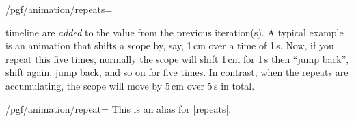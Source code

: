 \begin{key}{/pgf/animation/repeats=}
\begin{itemize}
            timeline are \emph{added} to the value from the previous
            iteration(s). A typical example is an animation that shifts a scope
            by, say, 1\,cm over a time of 1\,s. Now, if you repeat this five
            times, normally the scope will shift 1\,cm for 1\,s then ``jump
            back'', shift again, jump back, and so on for five times. In
            contrast, when the repeats are accumulating, the scope will move by
            5\,cm over 5\,s in total.
\begin{codeexample}[animation list={1,2,3,4,5}]
\end{codeexample}
\begin{codeexample}[animation list={1,2,3,4,5}]
\end{codeexample}
    \end{itemize}
\end{key}

\begin{key}{/pgf/animation/repeat=}
    This is an alias for |repeats|.
\end{key}


